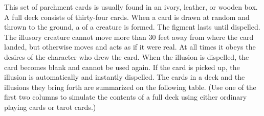 {

 This set of parchment cards is usually found in an ivory, leather, or wooden box. A full deck consists of thirty-four cards. When a card is drawn at random and thrown to the ground, a  of a creature is formed. The figment lasts until dispelled. The illusory creature cannot move more than 30 feet away from where the card landed, but otherwise moves and acts as if it were real. At all times it obeys the desires of the character who drew the card. When the illusion is dispelled, the card becomes blank and cannot be used again. If the card is picked up, the illusion is automatically and instantly dispelled. The cards in a deck and the illusions they bring forth are summarized on the following table. (Use one of the first two columns to simulate the contents of a full deck using either ordinary playing cards or tarot cards.)

}
